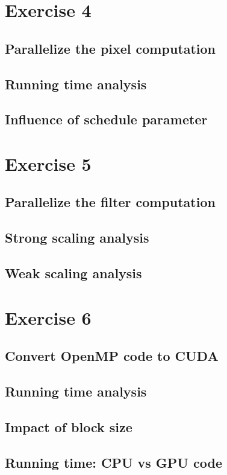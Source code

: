 \documentclass[a4paper,%
11pt,%
DIV12,
headsepline,%
headings=normal,
]{scrartcl}
\begin{document}
\section{Exercise 4}

\subsection{Parallelize the pixel computation}

\subsection{Running time analysis}

\subsection{Influence of schedule parameter}

\section{Exercise 5}

\subsection{Parallelize the filter computation}

\subsection{Strong scaling analysis}

\subsection{Weak scaling analysis}

\section{Exercise 6}

\subsection{Convert OpenMP code to CUDA}

\subsection{Running time analysis}

\subsection{Impact of block size}

\subsection{Running time: CPU vs GPU code}
\end{document}
